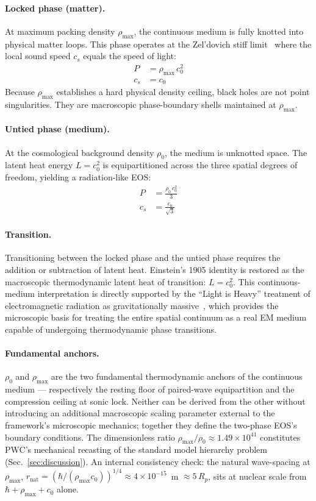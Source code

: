 \documentclass[aps,prd,twocolumn,superscriptaddress,amsmath,amssymb,nofootinbib,floatfix]{revtex4-2}
\newcommand{\rhomax}{\rho_{\max}}
\newcommand{\rhonaught}{\rho_{0}}
\newcommand{\cnaught}{c_{0}}
\begin{document}
\paragraph*{Locked phase (matter).}
At maximum packing density $\rhomax$, the continuous medium is fully knotted into physical matter loops. This phase operates at the Zel'dovich stiff limit~\cite{Zeldovich1962} where the local sound speed $c_s$ equals the speed of light:
\begin{align}
P &= \rhomax \, \cnaught^{2} \\
c_s &= \cnaught
\end{align}
Because $\rhomax$ establishes a hard physical density ceiling, black holes are not point singularities. They are macroscopic phase-boundary shells maintained at $\rhomax$.

\paragraph*{Untied phase (medium).}
At the cosmological background density $\rhonaught$, the medium is unknotted space. The latent heat energy $L = \cnaught^{2}$ is equipartitioned across the three spatial degrees of freedom, yielding a radiation-like EOS:
\begin{align}
P &= \frac{\rhonaught \, \cnaught^{2}}{3} \\
c_s &= \frac{\cnaught}{\sqrt{3}}
\end{align}

\paragraph*{Transition.}
Transitioning between the locked phase and the untied phase requires the addition or subtraction of latent heat. Einstein's 1905 identity is restored as the macroscopic thermodynamic latent heat of transition: $L = \cnaught^{2}$. This continuous-medium interpretation is directly supported by the ``Light is Heavy'' treatment of electromagnetic radiation as gravitationally massive~\cite{LightIsHeavy}, which provides the microscopic basis for treating the entire spatial continuum as a real EM medium capable of undergoing thermodynamic phase transitions.

\paragraph*{Fundamental anchors.}
$\rhonaught$ and $\rhomax$ are the two fundamental thermodynamic anchors of the continuous medium --- respectively the resting floor of paired-wave equipartition and the compression ceiling at sonic lock. Neither can be derived from the other without introducing an additional macroscopic scaling parameter external to the framework's microscopic mechanics; together they define the two-phase EOS's boundary conditions. The dimensionless ratio $\rhomax/\rhonaught \approx 1.49 \times 10^{41}$ constitutes PWC's mechanical recasting of the standard model hierarchy problem (Sec.~\ref{sec:discussion}). An internal consistency check: the natural wave-spacing at $\rhomax$, $r_{\text{nat}} = (\hbar/(\rhomax \cnaught))^{1/4} \approx 4 \times 10^{-15}$~m $\approx 5\,R_p$, sits at nuclear scale from $\hbar + \rhomax + \cnaught$ alone.
\end{document}
